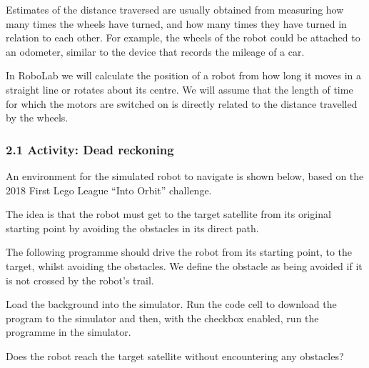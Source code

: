 \documentclass[letterpaper,10pt,english]{sphinxmanual}
\let\sphinxpxdimen\pdfpxdimen\else\newdimen\sphinxpxdimen
\begin{document}
Estimates of the distance traversed are usually obtained from measuring how many times the wheels have turned, and how many times they have turned in relation to each other. For example, the wheels of the robot could be attached to an odometer, similar to the device that records the mileage of a car.

In RoboLab we will calculate the position of a robot from how long it moves in a straight line or rotates about its centre. We will assume that the length of time for which the motors are switched on is directly related to the distance travelled by the wheels.


\subsubsection{2.1 Activity: Dead reckoning}
\label{\detokenize{content/03_Robot_Lab/Section_00_02:2.1-Activity:-Dead-reckoning}}
An environment for the simulated robot to navigate is shown below, based on the 2018 First Lego League “Into Orbit” challenge.

The idea is that the robot must get to the target satellite from its original starting point by avoiding the obstacles in its direct path.

\sphinxincludegraphics[width=1714\sphinxpxdimen,height=1020\sphinxpxdimen]{{Section_00_02_-_Jupyter_Notebook}.png}

The following programme should drive the robot from its starting point, to the target, whilst avoiding the obstacles. We define the obstacle as being avoided if it is not crossed by the robot’s  trail.

Load the  background into the simulator. Run the code cell to download the program to the simulator and then, with the  checkbox enabled, run the programme in the simulator.


Does the robot reach the target satellite without encountering any obstacles?
\end{document}
